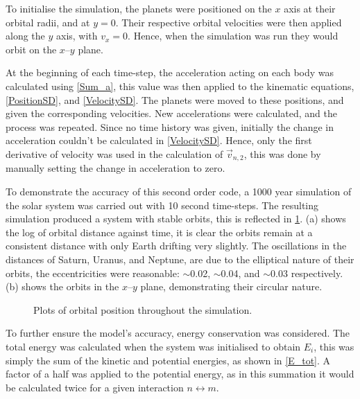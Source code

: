 \documentclass[a4paper,10pt]{article}
\begin{document}
To initialise the simulation, the planets were positioned on the $x$ axis at their orbital radii, and at $y=0$. Their respective orbital velocities were then applied along the $y$ axis, with $v_x = 0$. Hence, when the simulation was run they would orbit on the $x$--$y$ plane. 

At the beginning of each time-step, the acceleration acting on each body was calculated using \cref{Sum_a}, this value was then applied to the kinematic equations, \cref{PositionSD}, and \cref{VelocitySD}. The planets were moved to these positions, and given the corresponding velocities. New accelerations were calculated, and the process was repeated. Since no time history was given, initially the change in acceleration couldn't be calculated in \cref{VelocitySD}. Hence, only the first derivative of velocity was used in the calculation of $\vec v_{n,2}$, this was done by manually setting the change in acceleration to zero.

To demonstrate the accuracy of this second order code, a 1000 year simulation of the solar system was carried out with 10 second time-steps. The resulting simulation produced a system with stable orbits, this is reflected in \cref{Distance}.  (a) shows the log of orbital distance against time, it is clear the orbits remain at a consistent distance with only Earth drifting very slightly. The oscillations in the distances of Saturn, Uranus, and Neptune, are due to the elliptical nature of their orbits, the eccentricities were reasonable: $\sim$0.02, $\sim$0.04, and $\sim$0.03 respectively.  (b) shows the orbits in the $x$--$y$ plane, demonstrating their circular nature.

\begin{figure}[h!]
    \centering
    \qquad
    \caption{Plots of orbital position throughout the simulation.}%
    \label{Distance}%
\end{figure}

To further ensure the model's accuracy, energy conservation was considered. The total energy was calculated when the system was initialised to obtain $E_i$, this was simply the sum of the kinetic and potential energies, as shown in \cref{E_tot}. A factor of a half was applied to the potential energy, as in this summation it would be calculated twice for a given interaction $n \leftrightarrow m$. 
\end{document}
